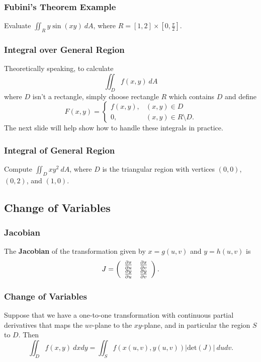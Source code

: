 \documentclass{beamer}
\begin{document}
\begin{frame}[t]
\frametitle{Fubini's Theorem Example}
\begin{Example}
Evaluate $\displaystyle\iint_R y\sin(xy)\ dA$, where $R = [1, 2]\times \left[0, \frac{\pi}{2}\right]$.
\end{Example}

\end{frame}

\begin{frame}
\frametitle{Integral over General Region}
Theoretically speaking, to calculate
$$
\iint_D f(x, y)\ dA
$$
where $D$ isn't a rectangle, simply choose rectangle $R$ which contains $D$ and define
$$
F(x, y) = \begin{cases} f(x, y),	&	(x, y)\in D\\ 0,	&	(x,y)\in R\setminus D.\end{cases}
$$
The next slide will help show how to handle these integrals in practice. 
\end{frame}

\begin{frame}[t]
\frametitle{Integral of General  Region}
\begin{Example}
Compute $\displaystyle\iint_D xy^2\ dA$, where $D$ is the triangular region with vertices $(0, 0)$, $(0, 2)$, and $(1, 0)$.
\end{Example}

\end{frame}

\subsection{Change of Variables}

\begin{frame}
\frametitle{Jacobian}
\begin{Definition}
The {\bf Jacobian} of the transformation given by $x = g(u, v)$ and $y = h(u, v)$ is
$$
J = \left(\begin{array}{c c} \frac{\partial x}{\partial u}	&	\frac{\partial x}{\partial v}\\ \frac{\partial y}{\partial u} &	\frac{\partial y}{\partial v}\end{array}\right).
$$
\end{Definition} 

\end{frame}

\begin{frame}
\frametitle{Change of Variables}
Suppose that we have a one-to-one transformation with continuous partial derivatives that maps the $uv$-plane to the $xy$-plane, and in particular the region $S$ to $D$. Then
$$
\iint_D f(x, y)\ dxdy = \iint_S f\left(x(u, v), y(u, v)\right)\left|\text{det}(J)\right|\ dudv.
$$

\end{frame}
\end{document}
